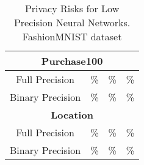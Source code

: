 \begin{table}[!htb]
\begin{center}
\begin{tabular}{|c|c|c|c|c|}
\hline
\hline
\multicolumn{5}{|c|}{\textbf{Purchase100}} \\
\hline
\multicolumn{2}{|c|}{Full Precision} & \% & \% & \cellcolor{red!25}\% \\
\multicolumn{2}{|c|}{Binary Precision} & \% & \% & \cellcolor{green!25}\% \\
\hline
\hline
\multicolumn{5}{|c|}{\textbf{Location}} \\
\hline
\multicolumn{2}{|c|}{Full Precision} & \% & \% & \cellcolor{red!25}\% \\
\multicolumn{2}{|c|}{Binary Precision} & \% & \% & \cellcolor{green!25}\% \\
\hline
\end{tabular}
\end{center}
\caption{Privacy Risks for Low Precision Neural Networks. FashionMNIST dataset}
\label{fmnist_quantize}
\end{table}
